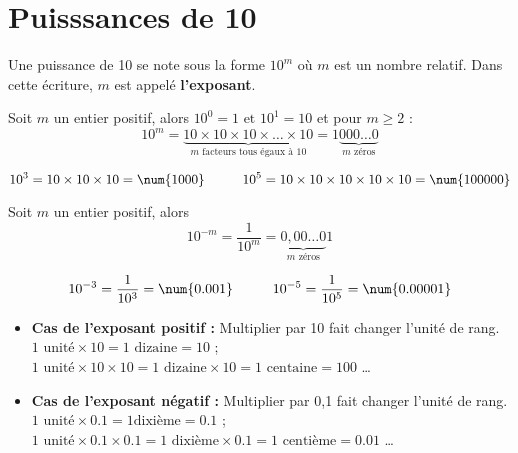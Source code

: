 \section{Puisssances de 10}
\begin{vocabulaireNotation}
    Une puissance de 10 se note sous la forme $10^m$ où $m$ est un nombre relatif.
    Dans cette écriture, $m$ est appelé \textbf{l'exposant}.
\end{vocabulaireNotation}

\begin{definition}
    Soit $m$ un entier positif, alors $10^0=1\mbox{ et }10^1=10$ et pour $m\geq 2$ :
    $$10^m=\underbrace{10\times10\times10\times\ldots\times10}_{\mbox{$m$ facteurs tous égaux à 10}}=1\underbrace{000\ldots0}_{\mbox{$m$ zéros}}$$
\end{definition}

\begin{exemples*1}

    $$10^3=10\times10\times10=\num{1 000}\kern1cm10^5=10\times10\times10\times10\times10=\num{100 000}$$
\end{exemples*1}

\begin{definition}
    Soit $m$ un entier positif, alors
    $$10^{-m}=\frac1{10^m}=\underbrace{0,00\ldots0}_{\mbox{$m$ zéros}}1$$
\end{definition}

\begin{exemples*1}

    $$10^{-3}=\dfrac1{10^3}=\num{0.001}\kern1cm10^{-5}=\dfrac1{10^5}=\num{0.000 01}$$
\end{exemples*1}

\begin{remarque}
    \begin{itemize}
        \item \textbf{Cas de  l'exposant positif :} Multiplier par 10 fait changer l'unité de rang.\\
        $1\text{ unité} \times 10 = 1\text{ dizaine} = 10$ ; \hfill $1\text{ unité}\times 10 \times 10= 1\text{ dizaine}\times 10 = 1\text{ centaine}=100$ \dots
        \item \textbf{Cas de  l'exposant négatif :} Multiplier par 0,1 fait changer l'unité de rang.\\
        $1\text{ unité}\times \num{0.1} = 1\text{dixième} = \num{0.1}$ ; \hfill $1\text{ unité}\times\num{0.1}\times\num{0.1} = 1\text{ dixième}\times \num{0.1} = 1\text{ centième} = \num{0.01}$ \dots
    \end{itemize}
    
    \smallskip
\end{remarque}

